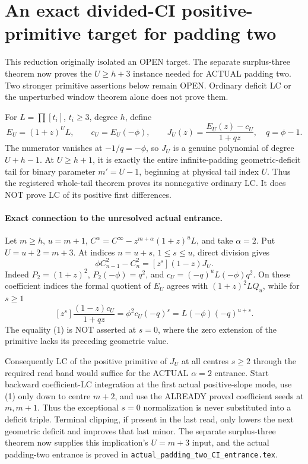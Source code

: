 \section{An exact divided-CI positive-primitive target for padding two}
This reduction originally isolated an OPEN target. The separate
surplus-three theorem now proves the $U\ge h+3$ instance needed for
ACTUAL padding two. Two stronger primitive assertions below remain
OPEN. Ordinary deficit LC or the unperturbed window theorem alone
does not prove them.

For $L=\prod[t_i]$, $t_i\ge3$, degree $h$, define
\[
 E_U=(1+z)^U L,\qquad c_U=E_U(-\phi),\qquad
 J_U(z)=\frac{E_U(z)-c_U}{1+qz},\quad q=\phi-1.
\]
The numerator vanishes at $-1/q=-\phi$, so $J_U$ is a genuine
polynomial of degree $U+h-1$. At $U\ge h+1$, it is exactly the
entire infinite-padding geometric-deficit tail for binary parameter
$m'=U-1$, beginning at physical tail index $U$. Thus the registered
whole-tail theorem proves its nonnegative ordinary LC. It does NOT
prove LC of its positive first differences.

\paragraph{Exact connection to the unresolved actual entrance.}
Let $m\ge h$, $u=m+1$, $C^\alpha=C^\infty-z^{m+\alpha}(1+z)^uL$,
and take $\alpha=2$. Put $U=u+2=m+3$. At indices
$n=u+s$, $1\le s\le u$, direct division gives
\[
 \phi C^2_{n-1}-C^2_n
      =[z^s](1-z)J_U.                              \tag{1}
\]
Indeed $P_2=(1+z)^2$, $P_2(-\phi)=q^2$, and
$c_U=(-q)^u L(-\phi)q^2$. On these coefficient indices the formal
quotient of $E_U$ agrees with $(1+z)^2LQ_u$, while for $s\ge1$
\[
 [z^s]\frac{(1-z)c_U}{1+qz}
       =\phi^2c_U(-q)^s=L(-\phi)(-q)^{u+s}.
\]
The equality (1) is NOT asserted at $s=0$, where the zero extension
of the primitive lacks its preceding geometric value.

Consequently LC of the positive primitive of $J_U$ at all centres
$s\ge2$ through the required read band would suffice for the ACTUAL
$\alpha=2$ entrance. Start backward coefficient-LC integration at
the first actual positive-slope mode, use (1) only down to centre
$m+2$, and use the ALREADY proved coefficient seeds at $m,m+1$.
Thus the exceptional $s=0$ normalization is never substituted into
a deficit triple. Terminal clipping, if present in the last read,
only lowers the next geometric deficit and improves that last minor.
The separate surplus-three theorem now supplies this implication's
$U=m+3$ input, and the actual padding-two entrance is proved in
\texttt{actual\_padding\_two\_CI\_entrance.tex}.

